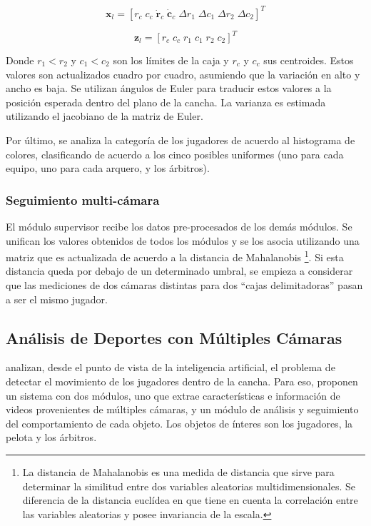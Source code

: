 \[
\mathbf{x}_l = [r_c \; c_c \;  \mathbf{\dot r}_c  \; \mathbf{\dot c}_c \;  \Delta r_1  \; \Delta c_1 \;  \Delta r_2 \;  \Delta c_2]^T
\]

\[
\mathbf{z}_l = [r_c \;  c_c  \; r_1  \; c_1  \; r_2  \; c_2]^T
\]

Donde $r_1 < r_2$ y $c_1 < c_2$ son los límites de la caja y
$r_c$ y $c_c$ sus centroides. Estos valores son
actualizados cuadro por cuadro, asumiendo que la variación en alto y ancho es
baja. Se utilizan ángulos de Euler para traducir estos valores a la posición
esperada dentro del plano de la cancha. La varianza es estimada utilizando el
jacobiano de la matriz de Euler.

Por último, se analiza la categoría de los
jugadores de acuerdo al histograma de colores, clasificando de acuerdo a los
cinco posibles uniformes (uno para cada equipo, uno para cada arquero, y los
árbitros).

\subsubsection{Seguimiento multi-cámara}

El módulo supervisor recibe los datos pre-procesados de los demás módulos.
Se unifican los valores obtenidos
de todos los módulos y se los asocia utilizando una matriz que es actualizada
de acuerdo a la distancia de Mahalanobis \footnote {La distancia de Mahalanobis
es una medida de distancia que sirve para determinar la similitud entre dos
variables aleatorias multidimensionales. Se diferencia de la distancia
euclídea en que tiene en cuenta la correlación entre
las variables aleatorias y posee invariancia de la escala.}. Si esta distancia queda por debajo de
un determinado umbral, se empieza a considerar que las mediciones de dos
cámaras distintas para dos ``cajas delimitadoras'' pasan a ser el mismo
jugador.

\subsection{Análisis de Deportes con Múltiples Cámaras}
\label{sec:var-camaras}


\citeauthor*{beetz-05} analizan, desde el punto de vista de la inteligencia
artificial, el problema de detectar el movimiento de los jugadores dentro
de la cancha. Para eso, proponen un sistema con dos módulos, uno que extrae
características e información de videos provenientes de múltiples cámaras, y
un módulo de análisis y seguimiento del comportamiento de cada objeto.
Los objetos de ínteres son los jugadores, la pelota y los árbitros.

